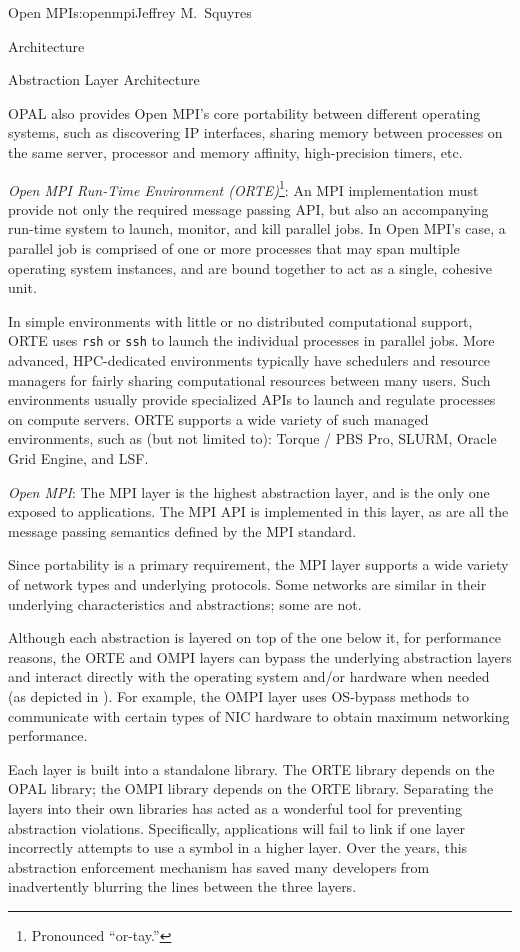 \begin{aosachapter}{Open MPI}{s:openmpi}{Jeffrey M.\ Squyres}
\begin{aosasect1}{Architecture}
\begin{aosasect2}{Abstraction Layer Architecture}
\begin{aosaitemize}
  OPAL also provides Open MPI's core portability between different
  operating systems, such as discovering IP interfaces, sharing
  memory between processes on the same server, processor and memory
  affinity, high-precision timers, etc.

\item \emph{Open MPI Run-Time Environment (ORTE)}\footnote{Pronounced
    ``or-tay.''}: An MPI implementation must provide not only the
  required message passing API, but also an accompanying run-time
  system to launch, monitor, and kill parallel jobs.  In Open MPI's
  case, a parallel job is comprised of one or more processes that may
  span multiple operating system instances, and are bound together to
  act as a single, cohesive unit.

  In simple environments with little or no distributed computational
  support, ORTE uses {\tt rsh} or {\tt ssh} to launch the individual
  processes in parallel jobs.  More advanced, HPC-dedicated
  environments typically have schedulers and resource managers for
  fairly sharing computational resources between many users.  Such
  environments usually provide specialized APIs to launch and regulate
  processes on compute servers.  ORTE supports a wide variety of such
  managed environments, such as (but not limited to): Torque / PBS
  Pro, SLURM, Oracle Grid Engine, and LSF.

\item \emph{Open MPI}: The MPI layer is the highest abstraction layer,
  and is the only one exposed to applications.  The MPI API is
  implemented in this layer, as are all the message passing semantics
  defined by the MPI standard.

  Since portability is a primary requirement, the MPI layer supports a
  wide variety of network types and underlying protocols.  Some
  networks are similar in their underlying characteristics and
  abstractions; some are not.
\end{aosaitemize}

Although each abstraction is layered on top of the one below it, for
performance reasons, the ORTE and OMPI layers can bypass the
underlying abstraction layers and interact directly with the operating
system and/or hardware when needed (as depicted in
).  For example, the OMPI layer uses
OS-bypass methods to communicate with certain types of NIC hardware to
obtain maximum networking performance.

Each layer is built into a standalone library.  The ORTE library
depends on the OPAL library; the OMPI library depends on the ORTE
library.
%
Separating the layers into their own libraries has acted as a
wonderful tool for preventing abstraction violations.
%
Specifically, applications will fail to link if one layer incorrectly
attempts to use a symbol in a higher layer.
%
Over the years, this abstraction enforcement mechanism has saved many
developers from inadvertently blurring the lines between the three
layers.


\end{aosasect2}
\end{aosasect1}
\end{aosachapter}

